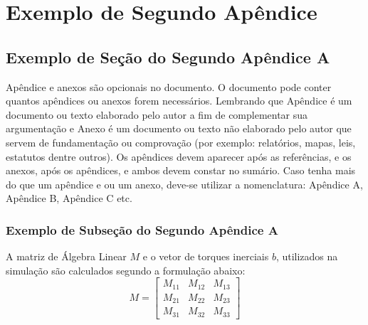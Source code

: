 \chapter{Exemplo de Segundo Ap\^{e}ndice}

\section{Exemplo de Seção do Segundo Ap\^{e}ndice A}

Apêndice e anexos são opcionais no documento. O documento pode conter quantos apêndices ou anexos forem necessários. Lembrando que Apêndice é um documento ou texto elaborado pelo autor a fim de complementar sua argumentação e Anexo é um documento ou texto não elaborado pelo autor que servem de fundamentação ou comprovação (por exemplo: relatórios, mapas, leis, estatutos dentre outros). Os apêndices devem aparecer após as referências, e os anexos, após os apêndices, e ambos devem constar no sumário.
Caso tenha mais do que um apêndice e ou um anexo, deve-se utilizar a nomenclatura: Apêndice A, Apêndice B, Apêndice C etc.

\subsection{Exemplo de Subseção do Segundo Ap\^{e}ndice A}

A matriz de Álgebra Linear $M$ e o vetor de torques inerciais $b$, utilizados na simulação são calculados segundo a formulação abaixo:
\begin{equation}
    M=\left[
        \begin{array}{ccc}
            M_{11} & M_{12} & M_{13} \\
            M_{21} & M_{22} & M_{23} \\
            M_{31} & M_{32} & M_{33}
        \end{array} \right]
\end{equation}